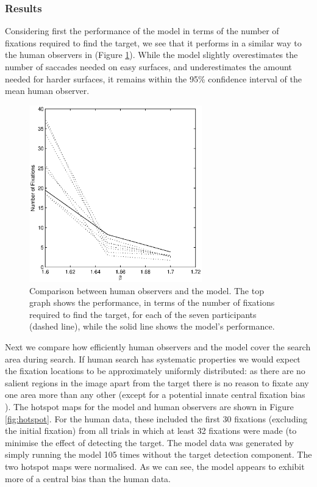\subsubsection{Results}
Considering first the performance of the model in terms of the number of fixations required to find the target, we see that it performs in a similar way to the human observers in \cite{clarke2009} (Figure \ref{fig:Model_Human_numfix}). While the model slightly overestimates the number of saccades needed on easy surfaces, and underestimates the amount needed for harder surfaces, it remains within the 95\% confidence interval of the mean human observer.  

\par

\begin{figure}
	\centering		\includegraphics[width=7.5cm]{figures/Model_Human_numfix.eps}
		\caption{Comparison between human observers and the model. The top graph shows the performance, in terms of the number of fixations required to find the target, for each of the seven participants (dashed line), while the solid line shows the model's performance.}
	\label{fig:Model_Human_numfix}
\end{figure}
Next we compare how efficiently human observers and the model cover the search area during search. If human search has systematic properties we would expect the fixation locations to be approximately uniformly distributed: as there are no salient regions in the image apart from the target there is no reason to fixate any one area more than any other (except for a potential innate central fixation bias \citep{tatler2007}). The hotspot maps for the model and human observers are shown in Figure \ref{fig:hotspot}. For the human data, these included the first 30 fixations (excluding the initial fixation) from all trials in which at least 32 fixations were made (to minimise the effect of detecting the target. The model data was generated by simply running the model 105 times without the target detection component. The two hotspot maps were normalised. As we can see, the model appears to exhibit more of a central bias than the human data.

